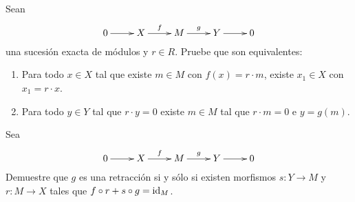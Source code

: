 \begin{exercise}
\label{xca:exactas1}
	Sean 
	\[
	\xymatrix{
	0\ar[r] 
	& X
	\ar[r]^-{f}
	& M
	\ar[r]^-{g}
	& Y\ar[r]
	& 0
	}
	\]
	una sucesión exacta de módulos y $r\in R$. Pruebe que son equivalentes:
	\begin{enumerate}
		\item Para todo $x\in X$ tal que existe $m\in M$ con
			$f(x)=r\cdot m$, existe $x_1\in X$ con $x_1=r\cdot x$. 
		\item Para todo $y\in Y$ tal que $r\cdot y=0$ existe $m\in M$
			tal que $r\cdot m=0$ e $y=g(m)$. 
		\end{enumerate}
\end{exercise}

%

\begin{exercise}
\label{xca:exactas2}
	Sea
	\[
	\xymatrix{
	 0\ar[r] 
	 & X
	 \ar[r]^-{f}
	 & M
	 \ar[r]^-{g}
	 & Y\ar[r]
	 & 0
	 }
	\]
	Demuestre que $g$ es una retracción si y sólo si 
	existen morfismos $s\colon Y\to M$ y $r\colon M\to X$  
	tales que $f\circ r+s\circ g=\operatorname{id}_M$.
%	
%
\end{exercise}

